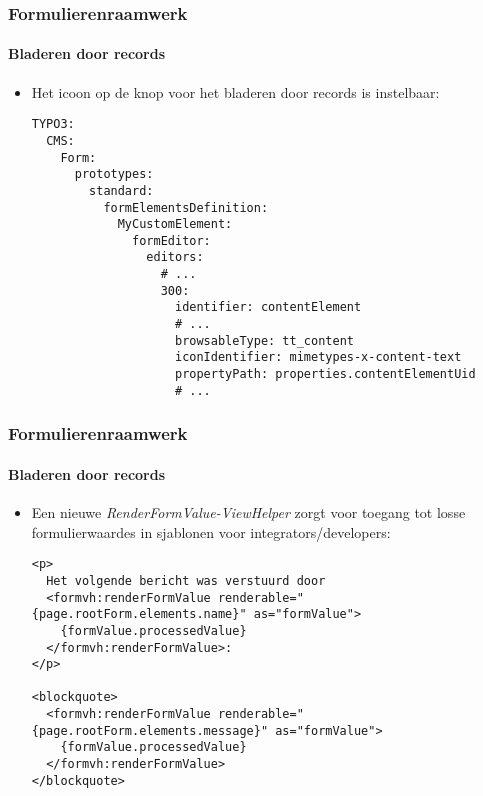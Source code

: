 
\begin{frame}[fragile]
	\frametitle{Formulierenraamwerk}
	\framesubtitle{Bladeren door records}

	\lstset{basicstyle=\tiny\ttfamily}

	\begin{itemize}
		\item Het icoon op de knop voor het bladeren door records is instelbaar:
\begin{lstlisting}
TYPO3:
  CMS:
    Form:
      prototypes:
        standard:
          formElementsDefinition:
            MyCustomElement:
              formEditor:
                editors:
                  # ...
                  300:
                    identifier: contentElement
                    # ...
                    browsableType: tt_content
                    iconIdentifier: mimetypes-x-content-text
                    propertyPath: properties.contentElementUid
                    # ...
\end{lstlisting}

	\end{itemize}

\end{frame}


\begin{frame}[fragile]
	\frametitle{Formulierenraamwerk}
	\framesubtitle{Bladeren door records}

	\lstset{basicstyle=\tiny\ttfamily}

	\begin{itemize}
		\item Een nieuwe \textit{RenderFormValue-ViewHelper} zorgt voor toegang tot losse formulierwaardes in sjablonen voor integrators/developers:
\begin{lstlisting}
<p>
  Het volgende bericht was verstuurd door
  <formvh:renderFormValue renderable="{page.rootForm.elements.name}" as="formValue">
    {formValue.processedValue}
  </formvh:renderFormValue>:
</p>

<blockquote>
  <formvh:renderFormValue renderable="{page.rootForm.elements.message}" as="formValue">
    {formValue.processedValue}
  </formvh:renderFormValue>
</blockquote>
\end{lstlisting}

	\end{itemize}

\end{frame}

